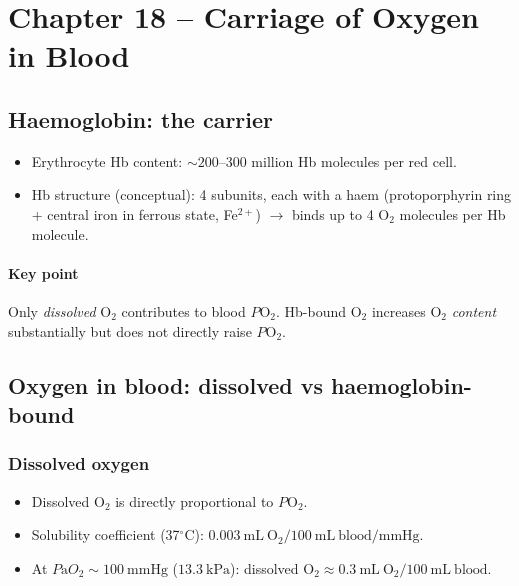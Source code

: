 \documentclass[11pt,a4paper]{article}
\begin{document}

\section{Chapter 18 -- Carriage of Oxygen in Blood}

\subsection{Haemoglobin: the carrier}
\begin{itemize}
  \item Erythrocyte Hb content: \(\sim 200\text{--}300\) million Hb molecules per red cell.
  \item Hb structure (conceptual): 4 subunits, each with a haem (protoporphyrin ring + central iron in ferrous state, Fe\(^{2+}\)) \(\rightarrow\) binds up to 4 O\(_2\) molecules per Hb molecule.
\end{itemize}

\paragraph{Key point}
Only \emph{dissolved} O\(_2\) contributes to blood \(P\mathrm{O}_2\). Hb-bound O\(_2\) increases O\(_2\) \emph{content} substantially but does not directly raise \(P\mathrm{O}_2\).

\subsection{Oxygen in blood: dissolved vs haemoglobin-bound}

\subsubsection{Dissolved oxygen}
\begin{itemize}
  \item Dissolved O\(_2\) is directly proportional to \(P\mathrm{O}_2\).
  \item Solubility coefficient (37\(^\circ\)C): \(0.003~\mathrm{mL~O_2}/100~\mathrm{mL~blood/mmHg}\).
  \item At \(P\mathrm{a}O_2 \sim 100~\mathrm{mmHg}\) (\(13.3~\mathrm{kPa}\)): dissolved O\(_2 \approx 0.3~\mathrm{mL~O_2}/100~\mathrm{mL~blood}\).
\end{itemize}
\end{document}

